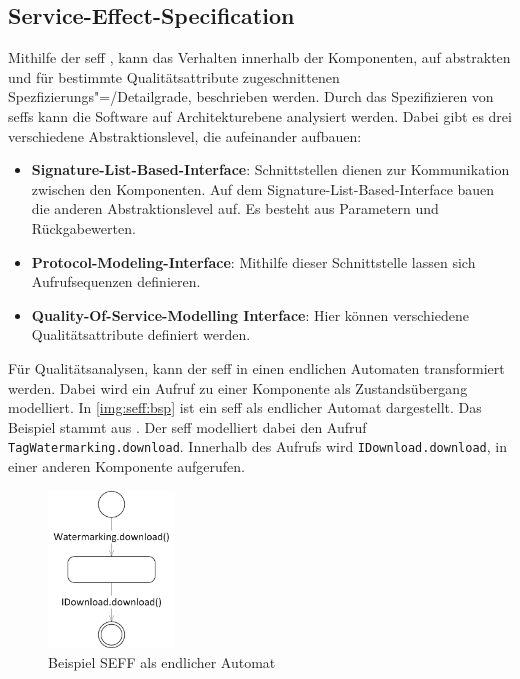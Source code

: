 \subsection{Service-Effect-Specification}
\label{sec:seff}
Mithilfe der \gls{seff} \cite{Reussner}, kann das Verhalten innerhalb der Komponenten, auf abstrakten und für bestimmte Qualitätsattribute zugeschnittenen Spezfizierungs"=/Detailgrade, beschrieben werden. 
Durch das Spezifizieren von \gls{seff}s kann die Software auf Architekturebene analysiert werden. Dabei gibt es drei verschiedene Abstraktionslevel, die aufeinander aufbauen:
\begin{itemize}
\item \textbf{Signature-List-Based-Interface}: Schnittstellen dienen zur Kommunikation zwischen den Komponenten. Auf dem Signature-List-Based-Interface bauen die anderen Abstraktionslevel auf. Es besteht aus Parametern und Rückgabewerten.
\item \textbf{Protocol-Modeling-Interface}: Mithilfe dieser Schnittstelle lassen sich Aufrufsequenzen definieren.
\item \textbf{Quality-Of-Service-Modelling Interface}: Hier können verschiedene Qualitätsattribute definiert werden.
\end{itemize}
Für Qualitätsanalysen, kann der \gls{seff} in einen endlichen Automaten transformiert werden. Dabei wird ein Aufruf zu einer Komponente als Zustandsübergang modelliert. In \autoref{img:seff:bsp} ist ein \gls{seff} als endlicher Automat dargestellt. Das Beispiel stammt aus \cite{Reussner}. Der \gls{seff} modelliert dabei den Aufruf \texttt{TagWatermarking.download}. Innerhalb des Aufrufs wird \texttt{IDownload.download}, in einer anderen Komponente aufgerufen.
\begin{figure}[h]
	\centering
  	\includegraphics[width=0.3\textwidth]{images/seff_bsp.png}
	\caption{Beispiel SEFF als endlicher Automat}
	\label{img:seff:bsp}
\end{figure} \par
